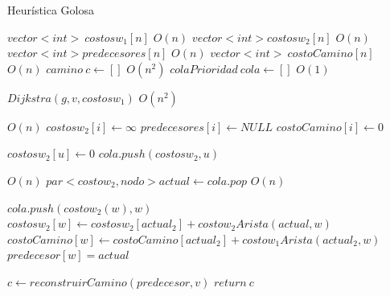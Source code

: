 \begin{algorithm}
	\caption{Heur\'istica Golosa}
\begin{algorithmic}[1]
\Statex


\State $ vector<int> \: costosw_1[n] $
\Comment $O(n)$
\State $vector<int> costosw_2[n]$
\Comment $O(n)$
\State $vector<int> predecesores[n]$
\Comment $O(n)$
\State $ vector<int> \: costoCamino[n] $
\Comment $O(n)$
\State $camino \: c \gets [] $
\Comment $O(n^2)$
\State $colaPrioridad \: cola \gets []$
\Comment $O(1)$

\Statex

\State $ Dijkstra(g, v, costosw_1) $
\Comment $O(n^2)$

\Statex

\Comment $ O(n)$
	\State $ costosw_2[i] \gets \infty $
	\State $ predecesores[i] \gets NULL $
	\State $ costoCamino[i] \gets 0 $	
\EndFor

\State $ costosw_2[u] \gets 0 $
\Statex
\State $ cola.push(costosw_2, u) $

	\Comment $ O(n)$
	\State $ par<costow_2, nodo> actual \gets cola.pop $ 
		\Comment $ O(n)$
		

			\State $cola.push(costow_2(w), w)$
			\State $ costosw_2[w] \gets costosw_2[actual_2] + costow_2Arista(actual,w) $
			\State $ costoCamino[w] \gets costoCamino[actual_2] + costow_1Arista(actual_2,w) $
			\State $ predecesor[w] = actual $

			\EndIf

		\EndIf
	\EndFor

\EndWhile

\State $ c \gets reconstruirCamino(predecesor,v) $
\State $ return \:c $

\EndProcedure
\end{algorithmic}
\end{algorithm}


